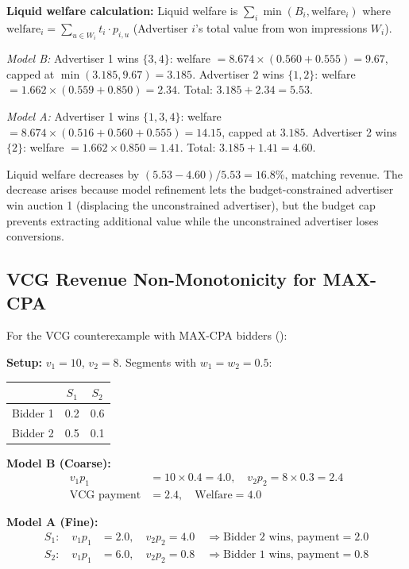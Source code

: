 \documentclass{article}
\theoremstyle{plain}
\theoremstyle{definition}
\theoremstyle{remark}
\begin{document}
\textbf{Liquid welfare calculation:} Liquid welfare is $\sum_i \min(B_i, \text{welfare}_i)$ where $\text{welfare}_i = \sum_{u \in W_i} t_i \cdot p_{i,u}$ (Advertiser $i$'s total value from won impressions $W_i$).

\emph{Model B:} Advertiser 1 wins $\{3,4\}$: welfare $= 8.674 \times (0.560 + 0.555) = 9.67$, capped at $\min(3.185, 9.67) = 3.185$. Advertiser 2 wins $\{1,2\}$: welfare $= 1.662 \times (0.559 + 0.850) = 2.34$. Total: $3.185 + 2.34 = 5.53$.

\emph{Model A:} Advertiser 1 wins $\{1,3,4\}$: welfare $= 8.674 \times (0.516 + 0.560 + 0.555) = 14.15$, capped at $3.185$. Advertiser 2 wins $\{2\}$: welfare $= 1.662 \times 0.850 = 1.41$. Total: $3.185 + 1.41 = 4.60$.

Liquid welfare decreases by $(5.53 - 4.60)/5.53 = 16.8\%$, matching revenue. The decrease arises because model refinement lets the budget-constrained advertiser win auction 1 (displacing the unconstrained advertiser), but the budget cap prevents extracting additional value while the unconstrained advertiser loses conversions.

\subsection{VCG Revenue Non-Monotonicity for MAX-CPA}
\label{app:counter-vcg-maxcpa}

For the VCG counterexample with MAX-CPA bidders ():

\textbf{Setup:} $v_1 = 10$, $v_2 = 8$. Segments with $w_1 = w_2 = 0.5$:
\begin{center}
\begin{tabular}{lcc}
\toprule
& $S_1$ & $S_2$ \\
\midrule
Bidder 1 & 0.2 & 0.6 \\
Bidder 2 & 0.5 & 0.1 \\
\bottomrule
\end{tabular}
\end{center}

\textbf{Model B (Coarse):}
\begin{align}
v_1 p_1 &= 10 \times 0.4 = 4.0, \quad v_2 p_2 = 8 \times 0.3 = 2.4 \\
\text{VCG payment} &= 2.4, \quad \text{Welfare} = 4.0
\end{align}

\textbf{Model A (Fine):}
\begin{align}
S_1: \quad v_1 p_1 &= 2.0, \quad v_2 p_2 = 4.0 \quad \Rightarrow \text{Bidder 2 wins, payment} = 2.0 \\
S_2: \quad v_1 p_1 &= 6.0, \quad v_2 p_2 = 0.8 \quad \Rightarrow \text{Bidder 1 wins, payment} = 0.8
\end{align}
\end{document}
